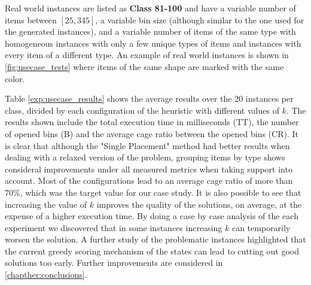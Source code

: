 Real world instances are listed as \textbf{Class 81-100} and have a variable number of items between $[25, 345]$, a variable bin size (although similar to the one used for the generated instances), and a variable number of items of the same type with homogeneous instances with only a few unique types of items and instances with every item of a different type.
An example of real world instances is shown in \cref{fig:usecase_tests} where items of the same shape are marked with the same color.

Table \ref{exp:usecase_results} shows the average results over the 20 instances per class, divided by each configuration of the heuristic with different values of $k$. The results shown include the total execution time in milliseconds (TT), the number of opened bins (B) and the average cage ratio between the opened bins (CR). It is clear that although the "Single Placement" method had better results when dealing with a relaxed version of the problem, grouping items by type shows consideral improvements under all measured metrics when taking support into account.
Most of the configurations lead to an average cage ratio of more than $70\%$, which was the target value for our case study.
It is also possible to see that increasing the value of $k$ improves the quality of the solutions, on average, at the expense of a higher execution time.
By doing a case by case analysis of the each experiment we discovered that in some instances increasing $k$ can temporarily worsen the solution. 
A further study of the problematic instances highlighted that the current greedy scoring mechanism of the states can lead to cutting out good solutions too early. 
Further improvements are considered in \cref{chapther:conclusions}.
\label{exp:usecase_results}

